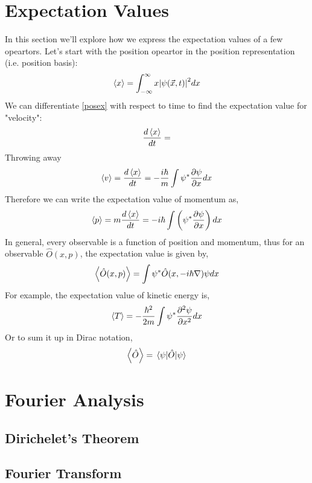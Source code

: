 \section{Expectation Values}
In this section we'll explore how we express the expectation values of a few opeartors. Let's start with the position opeartor in the position representation (i.e. position basis):
\begin{equation} \label{posex}
	\expval{x} = \int_{- \infty}^{\infty} x \abs{\psi(\vec{x}, t)}^{2} dx
\end{equation}
We can differentiate \ref{posex} with respect to time to find the expectation value for "velocity":
$$\frac{d \expval{x}}{dt} = $$
Throwing away 
\begin{equation}
	\expval{v} = \frac{d \expval{x}}{dt} = -\frac{i \hbar}{m} \int \psi^{*} \frac{\partial \psi}{\partial x} dx
\end{equation}
Therefore we can write the expectation value of momentum as,
\begin{equation}
	\expval{p} = m \frac{d \expval{x}}{dt} =  -i \hbar \int \left(\psi^{*} \frac{\partial \psi}{\partial x} \right) dx
\end{equation}
In general, every observable is a function of position and momentum, thus for an observable $\hat{O}(x,p)$, the expectation value is given by,
\begin{equation}
	\expval{\hat{O}(x,p)} = \int \psi^{*} \hat{O}(x,-i \hbar \nabla) \psi dx
\end{equation}
For example, the expectation value of kinetic energy is,
\begin{equation}
\expval{T} = -\frac{\hbar^{2}}{2m} \int \psi^{*} \frac{\partial^{2} \psi}{\partial x^{2}} dx
\end{equation}
Or to sum it up in Dirac notation,
\begin{equation}
	\expval{\hat{O}} = \expval{\hat{O}}{\psi}
\end{equation}
\section{Fourier Analysis}
\subsection{Dirichelet's Theorem}

\subsection{Fourier Transform}


